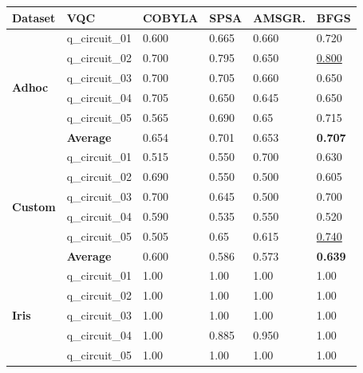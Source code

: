 \begin{table}[!h]
	\centering
	        
	\begin{tabular}{p{}p{}|p{}p{}p{}p{}}
		\hline 
		\textbf{Dataset}        & \textbf{VQC} & \textbf{COBYLA} & \textbf{SPSA}  & \textbf{AMSGR.} & \textbf{BFGS} \\
		\hline 
		\multirow{6}{*}{\textbf{Adhoc}}  & q\_circuit\_01 & 0.600  & 0.665 & 0.660   & 0.720 \\
		                        & q\_circuit\_02 & 0.700  & 0.795 & 0.650   & \underline{0.800} \\
		                        & q\_circuit\_03 & 0.700  & 0.705 & 0.660   & 0.650 \\
		                        & q\_circuit\_04 & 0.705 & 0.650 & 0.645   & 0.650 \\
		                        & q\_circuit\_05 & 0.565 & 0.690 & 0.65   & 0.715 \\
		\cline{2-6} 
		                        & \textbf{Average} & 0.654  & 0.701 & 0.653  & \textbf{0.707} \\
		\hline 
		\multirow{6}{*}{\textbf{Custom}} & q\_circuit\_01 & 0.515  & 0.550 & 0.700   & 0.630 \\
		                        & q\_circuit\_02 & 0.690  & 0.550 & 0.500   & 0.605 \\
		                        & q\_circuit\_03 & 0.700  & 0.645 & 0.500   & 0.700 \\
		                        & q\_circuit\_04 & 0.590  & 0.535 & 0.550  & 0.520 \\
		                        & q\_circuit\_05 & 0.505  & 0.65 & 0.615   & \underline{0.740} \\
		\cline{2-6} 
		                        & \textbf{Average}      & 0.600 & 0.586 & 0.573   & \textbf{0.639} \\
		\hline 
		\multirow{6}{*}{\textbf{Iris}}   & q\_circuit\_01 & 1.00  & 1.00 & 1.00   & 1.00 \\
		                        & q\_circuit\_02 & 1.00  & 1.00 & 1.00   & 1.00 \\
		                        & q\_circuit\_03 & 1.00  & 1.00 & 1.00   & 1.00 \\
		                        & q\_circuit\_04 & 1.00  & 0.885 & 0.950   & 1.00 \\
		                        & q\_circuit\_05 & 1.00  & 1.00 & 1.00   & 1.00 \\

\end{tabular}
\end{table}
